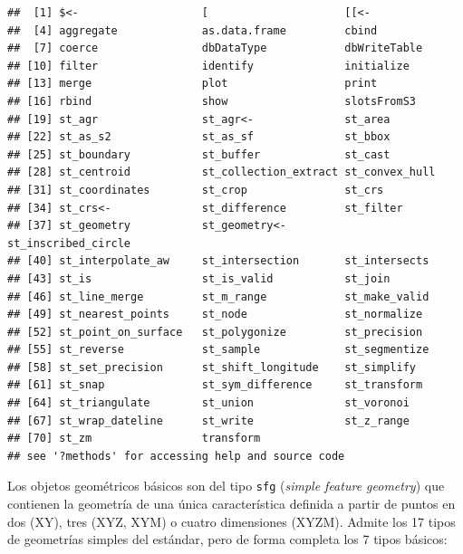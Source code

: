 \documentclass[
  spanish,
]{book}
\theoremstyle{break}
\theoremstyle{definition}
\theoremstyle{definition}
\theoremstyle{definition}
\theoremstyle{definition}
\theoremstyle{remark}
\begin{document}
\begin{verbatim}
##  [1] $<-                   [                     [[<-                 
##  [4] aggregate             as.data.frame         cbind                
##  [7] coerce                dbDataType            dbWriteTable         
## [10] filter                identify              initialize           
## [13] merge                 plot                  print                
## [16] rbind                 show                  slotsFromS3          
## [19] st_agr                st_agr<-              st_area              
## [22] st_as_s2              st_as_sf              st_bbox              
## [25] st_boundary           st_buffer             st_cast              
## [28] st_centroid           st_collection_extract st_convex_hull       
## [31] st_coordinates        st_crop               st_crs               
## [34] st_crs<-              st_difference         st_filter            
## [37] st_geometry           st_geometry<-         st_inscribed_circle  
## [40] st_interpolate_aw     st_intersection       st_intersects        
## [43] st_is                 st_is_valid           st_join              
## [46] st_line_merge         st_m_range            st_make_valid        
## [49] st_nearest_points     st_node               st_normalize         
## [52] st_point_on_surface   st_polygonize         st_precision         
## [55] st_reverse            st_sample             st_segmentize        
## [58] st_set_precision      st_shift_longitude    st_simplify          
## [61] st_snap               st_sym_difference     st_transform         
## [64] st_triangulate        st_union              st_voronoi           
## [67] st_wrap_dateline      st_write              st_z_range           
## [70] st_zm                 transform            
## see '?methods' for accessing help and source code
\end{verbatim}

Los objetos geométricos básicos son del tipo \texttt{sfg} (\emph{simple feature geometry}) que contienen la geometría de una única característica definida a partir de puntos en dos (XY), tres (XYZ, XYM) o cuatro dimensiones (XYZM).
Admite los 17 tipos de geometrías simples del estándar, pero de forma completa los 7 tipos básicos:
\end{document}
